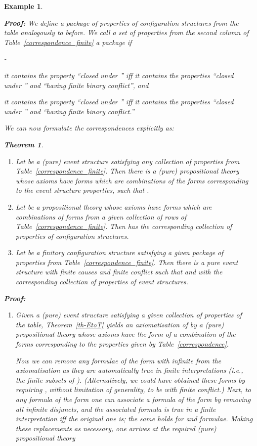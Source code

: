 \documentclass[twocolumn]{article}
\newtheorem{theo}{Theorem}
\newtheorem{exam}{Example}
\newenvironment{theorem}[1]{\begin{theo} \rm \label{th-#1} }{\end{theo}}
\newenvironment{example}[1]{\begin{exam} \rm \label{ex-#1} }{\end{exam}}
\newenvironment{proof}{\begin{trivlist} \item[\hspace{\labelsep}\bf
Proof:]}{\hfill \end{trivlist}}
\newenvironment{itemise2}{\begin{list}{{\bf --}}{\leftmargin 15pt
                        \labelwidth\leftmargini\advance\labelwidth-\labelsep
                        \topsep 2pt \itemsep 1pt \parsep 1pt}}{\end{list}}
\newcommand{\pf}{{\bf Proof:\ }}
\begin{document}
\begin{example}{causality}
\begin{proof}
We define a package of properties of configuration structures from the 
table analogously to before. We call a set of properties from the second column of
Table~\ref{correspondence_finite} a {package }if
\begin{itemise2}
\itemsep 0pt
\item it contains the property
``closed under '' iff  it contains the properties
``closed under '' and ``having finite binary conflict'',
and
\item it contains the property
``closed under '' iff it contains the properties
``closed under '' and ``having finite binary conflict.''
\vspace{2pt}
\end{itemise2}
We can now formulate the correspondences explicitly as:
\begin{theorem}{finite}~
\begin{enumerate}
\item Let  be a (pure)  event structure
satisfying any collection of properties
from Table~\ref{correspondence_finite}. Then there is a (pure) propositional
theory  whose axioms
have forms which are combinations of the forms corresponding to the event structure 
properties, such that .
\item Let  be a propositional theory whose axioms
have forms which are combinations of forms from a given collection of rows of 
Table~\ref{correspondence_finite}. Then  has the corresponding 
collection of properties of configuration structures.
\item Let  be a finitary configuration structure satisfying a
given package of properties from Table~\ref{correspondence_finite}.
Then there is a pure event structure  with finite causes and
finite conflict such that  and with the
corresponding collection of properties of event structures.
\end{enumerate}
\end{theorem}
\pf
\begin{enumerate}
\item 
Given a (pure) event structure 
satisfying a given collection of properties of the table, 
Theorem~\ref{th-EtoT} yields an axiomatisation of 
 by a (pure) propositional theory  whose axioms have 
the form of a combination of the forms corresponding to
the  properties given by Table~\ref{correspondence}.

Now we can remove any formulae of the form  with  infinite
from the axiomatisation as they are automatically true in finite
interpretations (i.e., the finite subsets of ).  (Alternatively, we
could have obtained these forms by requiring , without limitation
of generality, to be with finite conflict.)  Next, to any formula of
the form  one can associate a formula of the form
 by removing all infinite disjuncts, and the
associated formula is true in a finite interpretation iff the original
one is; the same holds for  and 
formulae. Making these replacements as necessary, one arrives at the
required (pure) propositional theory


\end{enumerate}
\end{proof}
\end{example}
\end{document}
